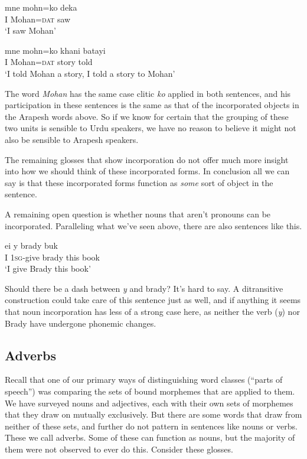 \documentclass[pdftex,12pt,letterpaper]{article}
\let\ipa\textipa
\def\sw{\ipa{\super w}}
\begin{document}
\begin{exe}
\ex
\gll m\ipa{\~E}ne moh\ipa{@}n=ko dek\ipa{\super h}a \\
I Mohan=\textsc{dat} saw \\
\trans `I saw Mohan'

\ex 
\gll m\ipa{\~E}ne moh\ipa{@}n=ko k\ipa{@}hani batayi \\
I Mohan=\textsc{dat} story told \\
\trans `I told Mohan a story, I told a story to Mohan'
\end{exe}

\noindent The word \emph{Mohan} has the same case clitic \emph{ko} applied in both sentences, and his participation in these sentences is the same as that of the incorporated objects in the Arapesh words above. So if we know for certain that the grouping of these two units is sensible to Urdu speakers, we have no reason to believe it might not also be sensible to Arapesh speakers.

The remaining glosses that show incorporation do not offer much more insight into how we should think of these incorporated forms. In conclusion all we can say is that these incorporated forms function as \emph{some} sort of object in the sentence.

A remaining open question is whether nouns that aren't pronouns can be incorporated. Paralleling what we've seen above, there are also sentences like this.

\begin{exe}
\ex
 \gll ei y\ipa{@-k@n} brady \ipa{@kud@k} buk\sw \\
 I \textsc{1sg}-give brady this book\\
 \trans `I give Brady this book'
 \end{exe}
 
\noindent Should there be a dash between \emph{y\ipa{@-k@n}} and brady? It's hard to say. A ditransitive construction could take care of this sentence just as well, and if anything it seems that noun incorporation has less of a strong case here, as neither the verb (\emph{y\ipa{@-k@n}}) nor Brady have undergone phonemic changes.

\subsection{Adverbs}

Recall that one of our primary ways of distinguishing word classes (``parts of speech'') was comparing the sets of bound morphemes that are applied to them. We have surveyed nouns and adjectives, each with their own sets of morphemes that they draw on mutually exclusively. But there are some words that draw from neither of these sets, and further do not pattern in sentences like nouns or verbs. These we call adverbs. Some of these can function as nouns, but the majority of them were not observed to ever do this. Consider these glosses. 
\end{document}
